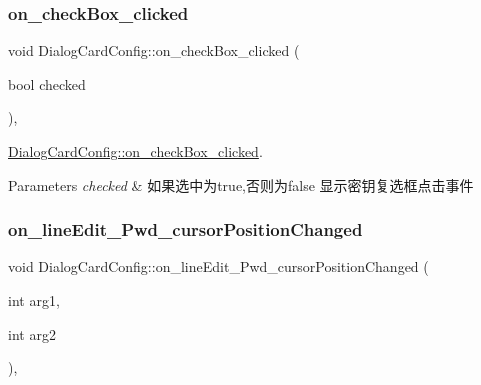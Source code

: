 \mbox{\label{class_dialog_card_config_a50d4d52916bb20bc93ceb0a9d515b0ca}} 
\subsubsection{\texorpdfstring{on\_checkBox\_clicked}{on\_checkBox\_clicked}}
{\footnotesize\ttfamily void Dialog\+Card\+Config\+::on\+\_\+check\+Box\+\_\+clicked (\begin{DoxyParamCaption}\item[{bool}]{checked }\end{DoxyParamCaption})\hspace{0.3cm}{\ttfamily [private]}, {\ttfamily [slot]}}



\mbox{\hyperlink{class_dialog_card_config_a50d4d52916bb20bc93ceb0a9d515b0ca}{Dialog\+Card\+Config\+::on\+\_\+check\+Box\+\_\+clicked}}. 


\begin{DoxyParams}{Parameters}
{\em checked} & 如果选中为true,否则为false 显示密钥复选框点击事件 \\
\hline
\end{DoxyParams}
\mbox{\label{class_dialog_card_config_a9f395a60ba0f64df7eb1543c2750c868}} 
\subsubsection{\texorpdfstring{on\_lineEdit\_Pwd\_cursorPositionChanged}{on\_lineEdit\_Pwd\_cursorPositionChanged}}
{\footnotesize\ttfamily void Dialog\+Card\+Config\+::on\+\_\+line\+Edit\+\_\+\+Pwd\+\_\+cursor\+Position\+Changed (\begin{DoxyParamCaption}\item[{int}]{arg1,  }\item[{int}]{arg2 }\end{DoxyParamCaption})\hspace{0.3cm}{\ttfamily [private]}, {\ttfamily [slot]}}



